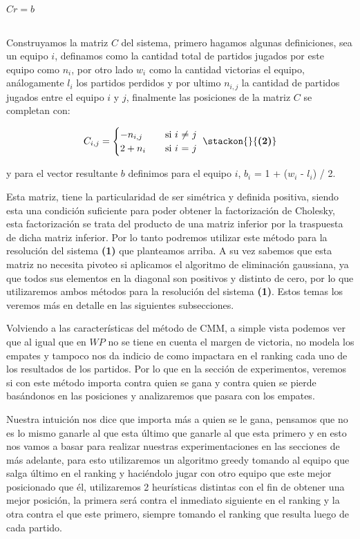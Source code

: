 \hfill $Cr=b$ \hfill {}

\\
Construyamos la matriz $C$ del sistema, primero hagamos algunas definiciones, sea un equipo $i$, definamos como la cantidad total de partidos jugados por este equipo como $n_i$, por otro lado $w_i$ como la cantidad victorias el equipo, análogamente $l_i$ los partidos perdidos y por ultimo $n_{i,j}$ la cantidad de partidos jugados entre el equipo $i$ y $j$, finalmente las posiciones de la matriz $C$ se completan con: 

\[ C_{i,j} =
    \begin{cases}
        -n_{i,j}       & \quad \text{si }  \text{$i$ $\neq$ $j$} \\
        2+n_i & \quad \text{si } \text{$i$ $=$ $j$ }\\
    \end{cases}\hfill \stackon{}{\textbf{(2)}}
$$
  $$  \]
                    
y para el vector resultante $b$ definimos para el equipo $i$, $b_i$ = 1 +  ($w_i$ - $l_i$) / 2.

Esta matriz, tiene la particularidad de ser simétrica y definida positiva, siendo esta una condición suficiente para poder obtener la factorización de Cholesky, esta factorización se trata del producto de una matriz inferior por la traspuesta de dicha matriz inferior. Por lo tanto podremos utilizar este método para la resolución del sistema \textbf{(1)} que planteamos arriba. A su vez sabemos que esta matriz no necesita pivoteo si aplicamos el algoritmo de eliminación gaussiana, ya que todos sus elementos en la diagonal son positivos y distinto de cero, por lo que utilizaremos ambos métodos para la resolución del sistema \textbf{(1)}. Estos temas los veremos más en detalle en las siguientes subsecciones.
    
Volviendo a las características del método de CMM, a simple vista podemos ver que al igual que en $WP$ no se tiene en cuenta el margen de victoria, no modela los empates y tampoco nos da indicio de como impactara en el ranking cada uno de los resultados de los partidos. Por lo que en la sección de experimentos, veremos si con este método importa contra quien se gana y contra quien se pierde basándonos en las posiciones y analizaremos que pasara con los empates.

Nuestra intuición nos dice que importa más a quien se le gana, pensamos que no es lo mismo ganarle al que esta último que ganarle al que esta primero y en esto nos vamos a basar para realizar nuestras experimentaciones en las secciones de más adelante, para esto utilizaremos un algoritmo greedy tomando al equipo que salga último en el ranking y haciéndolo jugar con otro equipo que este mejor posicionado que él, utilizaremos 2 heurísticas distintas con el fin de obtener una mejor posición, la primera será contra el inmediato siguiente en el ranking y la otra contra el que este primero, siempre tomando el ranking que resulta luego de cada partido.


